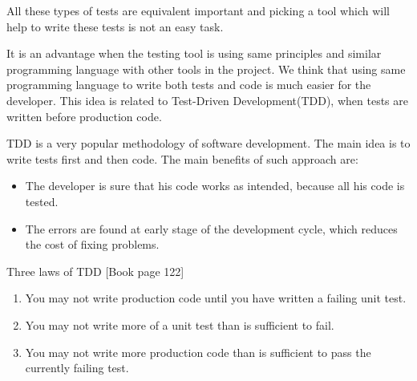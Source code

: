 		All these types of tests are equivalent important and picking a tool which
		will help to write these tests is not an easy task. 
		
		It is an advantage when	the testing tool is using same principles and similar programming language
		with other tools in the project. We think that using same programming language
		to write both tests and code is much easier for the developer. This idea is
		related to Test-Driven Development(TDD), when tests are written
		before production code.
		
		TDD is a very popular methodology of software development. The main idea is to
		write tests first and then code. The main benefits of such approach are:
			\begin{itemize}
			  \item The developer is sure that his code works as intended, because all
			  his code is tested.
				\item The errors are found at early stage of the development cycle, which
				reduces the cost of fixing problems.
			\end{itemize}
			
			Three laws of TDD \cite[pp122]{Cleancode}[Book page 122]
				\begin{enumerate}
				  \item You may not write production code until you have written a failing unit	test.
				  \item You may not write more of a unit test than is sufficient to fail.
				  \item You may not write more production code than is sufficient to pass the
				currently failing test.
				\end{enumerate}
			\iffalse	
					\subsection {Approaches in Web Testing}	
						\begin{textit}
							In this chapter I will explain
							what does testing actually meands. What types of testing exist: unit, integration, user-interface, regression,
						etc. What are the differences between these types of testing.
						
						Next I will prove why testing is so important in software development. Here I
						would like to mention some information about \textit{Quality control}. The
						idea is to show that testing increases the speed of software
						development and also improves it's quality. So in terms of quality control testing will
						decrease the price and increase the value of the product for the end user.
						
						Also I want to mention other methodologies like \textit{Agile development},
						\textit{User experience design} and \textit{Test Driven Development}. And how
						testing can be used/integrated with these methodologies/processes.
						\end{textit}
			\fi